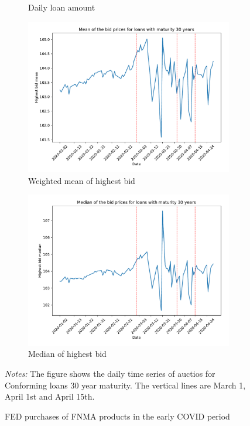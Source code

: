 \documentclass[11pt,a4paper]{article}
\begin{document}
\begin{figure}[h]
\begin{subfigure}[b]{0.49\textwidth}
      \caption{ Daily loan amount}
     \end{subfigure}
     \begin{subfigure}[b]{0.49\textwidth}
      \includegraphics[width=0.998\textwidth]{../results/figures/w_winner_bid_mean_mat30_loan1_timeseries_nr_1_7.pdf}
      \caption{ Weighted mean of highest bid}
     \end{subfigure}
     \begin{subfigure}[b]{0.49\textwidth}
      \includegraphics[width=0.998\textwidth]{../results/figures/winner_bid_median_mat30_loan1_timeseries_nr_1_7.pdf}
      \caption{ Median of highest bid}
     \end{subfigure}
   \caption{FED purchases of FNMA products in the early COVID period} 
   \begin{minipage}{\textwidth}
      \footnotesize{\textit{Notes:} The figure shows the daily time series of auctios for Conforming loans 30 year maturity. The vertical lines are March 1, April 1st and April 15th. } 
      \end{minipage}
\end{figure}
\end{document}
